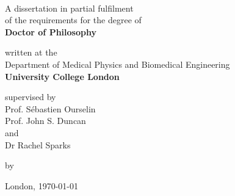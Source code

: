 \thispagestyle{empty}
\begin{titlepage}
\addtolength{\wpXoffset}{-21cm}
\addtolength{\wpYoffset}{13.5cm}
%
	\begin{center}
		\vspace*{2.5cm}

		\huge{\bfseries \thetitle}\\%
		\vspace*{1cm}

		\normalsize{A dissertation in partial fulfilment}\\%
		\vspace*{0.2cm}
		\normalsize{of the requirements for the degree of}\\%
		\vspace*{0.2cm}
		\large{\bfseries Doctor of Philosophy}%
		\vfill

		\normalsize{written at the}\\%
		\vspace*{0.2cm}
		\large{Department of Medical Physics and Biomedical Engineering}\\%
		\vspace*{0.2cm}
		\large{\bfseries University College London}\\
		\vfill

		\normalsize{supervised by}\\
		\vspace*{0.2cm}
		\large{Prof. Sébastien Ourselin}\\
		\vspace*{0.2cm}
		\large{Prof. John S. Duncan}\\
		\vspace*{0.2cm}
		\normalsize{and}\\
		\vspace*{0.2cm}
		\large{Dr Rachel Sparks}\\
		\vfill

		\normalsize{by}\\%
		\large{\textit{\theauthor}}

		\vfill
	\noindent London, \today
	\end{center}

\end{titlepage}
